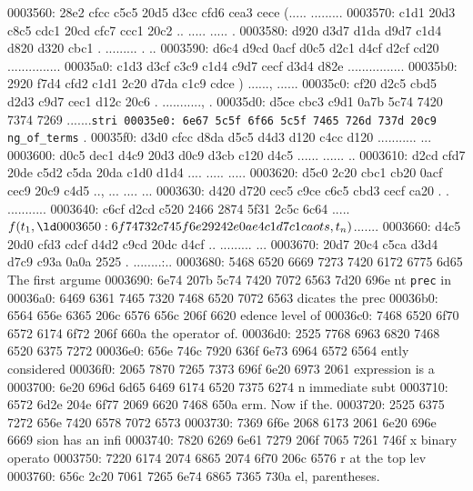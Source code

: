 \begin{bo
00010e0: 7865 647d 5c62 6567 696e 7b76 6572 6261  xed}
\begin{verba
00010f0: 7469 6d7d 0a20 2023 7479 7065 2074 6572  tim}
\begin{
0001c40: 7665 7262 6174 696d 7d0a 2020 236c 6574  verbatim}
\begin{boxe
00027a0: 647d 5c62 6567 696e 7b76 6572 6261 7469  d}
\begin{verbati
00027b0: 6d7d 0a20 2023 6c65 7420 696e 6669 7865  m}
\begin{v
0002c60: 6572 6261 7469 6d7d 0a20 2023 6c65 7420  erbatim}
\begin{
0002dc0: 7665 7262 6174 696d 7d0a 2020 236c 6574  verbatim}
\begin{boxed
0002f30: 7d5c 6265 6769 6e7b 7665 7262 6174 696d  }
\begin{verbatim
0002f40: 7d0a 2020 236c 6574 2068 6428 683a 3a74  }
0003560: 28e2 cfcc c5c5 20d5 d3cc cfd6 cea3 cece  (..... .........
0003570: c1d1 20d3 c8c5 cdc1 20cd cfc7 ccc1 20c2  .. ..... ..... .
0003580: d920 d3d7 d1da d9d7 c1d4 d820 d320 cbc1  . ......... . ..
0003590: d6c4 d9cd 0acf d0c5 d2c1 d4cf d2cf cd20  ............... 
00035a0: c1d3 d3cf c3c9 c1d4 c9d7 cecf d3d4 d82e  ................
00035b0: 2920 f7d4 cfd2 c1d1 2c20 d7da c1c9 cdce  ) ......, ......
00035c0: cf20 d2c5 cbd5 d2d3 c9d7 cec1 d12c 20c6  . ..........., .
00035d0: d5ce cbc3 c9d1 0a7b 5c74 7420 7374 7269  .......{\tt stri
00035e0: 6e67 5c5f 6f66 5c5f 7465 726d 737d 20c9  ng\_of\_terms} .
00035f0: d3d0 cfcc d8da d5c5 d4d3 d120 c4cc d120  ........... ... 
0003600: d0c5 dec1 d4c9 20d3 d0c9 d3cb c120 d4c5  ...... ...... ..
0003610: d2cd cfd7 20de c5d2 c5da 20da c1d0 d1d4  .... ..... .....
0003620: d5c0 2c20 cbc1 cb20 0acf cec9 20c9 c4d5  .., ... .... ...
0003630: d420 d720 cec5 c9ce c6c5 cbd3 cecf ca20  . . ........... 
0003640: c6cf d2cd c520 2466 2874 5f31 2c5c 6c64  ..... $f(t_1,\ld
0003650: 6f74 732c 745f 6e29 242e 0ae4 c1d7 c1ca  ots,t_n)$.......
0003660: d4c5 20d0 cfd3 cdcf d4d2 c9cd 20dc d4cf  .. ......... ...
0003670: 20d7 20c4 c5ca d3d4 d7c9 c93a 0a0a 2525   . ........:..%
0003680: 5468 6520 6669 7273 7420 6172 6775 6d65  The first argume
0003690: 6e74 207b 5c74 7420 7072 6563 7d20 696e  nt {\tt prec} in
00036a0: 6469 6361 7465 7320 7468 6520 7072 6563  dicates the prec
00036b0: 6564 656e 6365 206c 6576 656c 206f 6620  edence level of 
00036c0: 7468 6520 6f70 6572 6174 6f72 206f 660a  the operator of.
00036d0: 2525 7768 6963 6820 7468 6520 6375 7272  %
00036e0: 656e 746c 7920 636f 6e73 6964 6572 6564  ently considered
00036f0: 2065 7870 7265 7373 696f 6e20 6973 2061   expression is a
0003700: 6e20 696d 6d65 6469 6174 6520 7375 6274  n immediate subt
0003710: 6572 6d2e 204e 6f77 2069 6620 7468 650a  erm. Now if the.
0003720: 2525 6375 7272 656e 7420 6578 7072 6573  %
0003730: 7369 6f6e 2068 6173 2061 6e20 696e 6669  sion has an infi
0003740: 7820 6269 6e61 7279 206f 7065 7261 746f  x binary operato
0003750: 7220 6174 2074 6865 2074 6f70 206c 6576  r at the top lev
0003760: 656c 2c20 7061 7265 6e74 6865 7365 730a  el, parentheses.

\end{verbatim
0002f40: 7d0a 2020 236c 6574 2068 6428 683a 3a74  }
\end{boxed
0002f30: 7d5c 6265 6769 6e7b 7665 7262 6174 696d  }
\end{
0002dc0: 7665 7262 6174 696d 7d0a 2020 236c 6574  verbatim}
\end{v
0002c60: 6572 6261 7469 6d7d 0a20 2023 6c65 7420  erbatim}
\end{verbati
00027b0: 6d7d 0a20 2023 6c65 7420 696e 6669 7865  m}
\end{boxe
00027a0: 647d 5c62 6567 696e 7b76 6572 6261 7469  d}
\end{
0001c40: 7665 7262 6174 696d 7d0a 2020 236c 6574  verbatim}
\end{verba
00010f0: 7469 6d7d 0a20 2023 7479 7065 2074 6572  tim}
\end{bo
00010e0: 7865 647d 5c62 6567 696e 7b76 6572 6261  xed}
